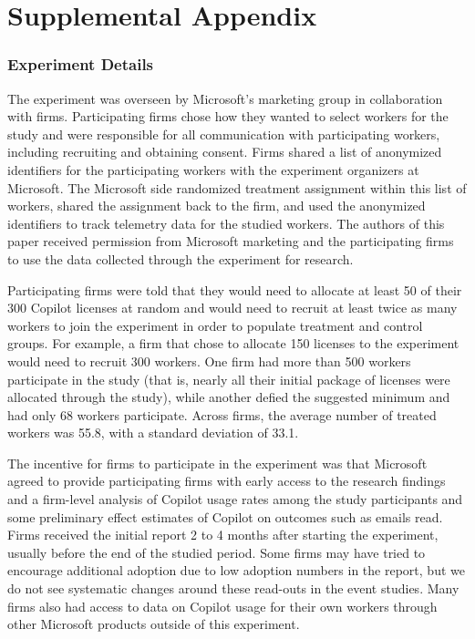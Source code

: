 \documentclass{article}
\begin{document}
\part*{Supplemental Appendix}


\section{Experiment Details \label{app:exp}}

The experiment was overseen by Microsoft's marketing group in collaboration with firms. Participating firms chose how they wanted to select workers for the study and were responsible for all communication with participating workers, including recruiting and obtaining consent. Firms shared a list of anonymized identifiers for the participating workers with the experiment organizers at Microsoft. The Microsoft side randomized treatment assignment within this list of workers, shared the assignment back to the firm, and used the anonymized identifiers to track telemetry data for the studied workers. The authors of this paper received permission from Microsoft marketing and the participating firms to use the data collected through the experiment for research.

Participating firms were told that they would need to allocate at least 50 of their 300 Copilot licenses at random and would need to recruit at least twice as many workers to join the experiment in order to populate treatment and control groups. For example, a firm that chose to allocate 150 licenses to the experiment would need to recruit 300 workers. One firm had more than 500 workers participate in the study (that is, nearly all their initial package of licenses were allocated through the study), while another defied the suggested minimum and had only 68 workers participate. Across firms, the average number of treated workers was 55.8, with a standard deviation of 33.1.  

The incentive for firms to participate in the experiment was that Microsoft agreed to provide participating firms with early access to the research findings and a firm-level analysis of Copilot usage rates among the study participants and some preliminary effect estimates of Copilot on outcomes such as emails read. Firms received the initial report 2 to 4 months after starting the experiment, usually before the end of the studied period. Some firms may have tried to encourage additional adoption due to low adoption numbers in the report, but we do not see systematic changes around these read-outs in the event studies. Many firms also had access to data on Copilot usage for their own workers through other Microsoft products outside of this experiment.
\end{document}
